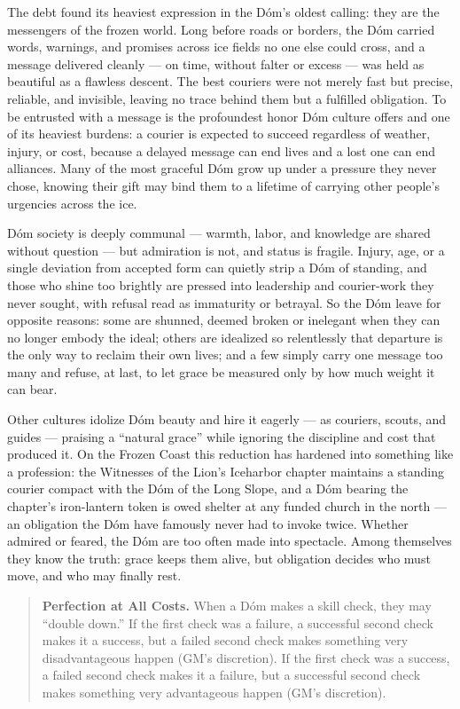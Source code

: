 The debt found its heaviest expression in the Dóm's oldest calling: they are the messengers of the frozen world. Long before roads or borders, the Dóm carried words, warnings, and promises across ice fields no one else could cross, and a message delivered cleanly --- on time, without falter or excess --- was held as beautiful as a flawless descent. The best couriers were not merely fast but precise, reliable, and invisible, leaving no trace behind them but a fulfilled obligation. To be entrusted with a message is the profoundest honor Dóm culture offers and one of its heaviest burdens: a courier is expected to succeed regardless of weather, injury, or cost, because a delayed message can end lives and a lost one can end alliances. Many of the most graceful Dóm grow up under a pressure they never chose, knowing their gift may bind them to a lifetime of carrying other people's urgencies across the ice.

Dóm society is deeply communal --- warmth, labor, and knowledge are shared without question --- but admiration is not, and status is fragile. Injury, age, or a single deviation from accepted form can quietly strip a Dóm of standing, and those who shine too brightly are pressed into leadership and courier-work they never sought, with refusal read as immaturity or betrayal. So the Dóm leave for opposite reasons: some are shunned, deemed broken or inelegant when they can no longer embody the ideal; others are idealized so relentlessly that departure is the only way to reclaim their own lives; and a few simply carry one message too many and refuse, at last, to let grace be measured only by how much weight it can bear.

Other cultures idolize Dóm beauty and hire it eagerly --- as couriers, scouts, and guides --- praising a ``natural grace'' while ignoring the discipline and cost that produced it. On the Frozen Coast this reduction has hardened into something like a profession: the Witnesses of the Lion's Iceharbor chapter maintains a standing courier compact with the Dóm of the Long Slope, and a Dóm bearing the chapter's iron-lantern token is owed shelter at any funded church in the north --- an obligation the Dóm have famously never had to invoke twice. Whether admired or feared, the Dóm are too often made into spectacle. Among themselves they know the truth: grace keeps them alive, but obligation decides who must move, and who may finally rest.

\begin{quote}
\textbf{Perfection at All Costs.} When a Dóm makes a skill check, they may ``double down.'' If the first check was a failure, a successful second check makes it a success, but a failed second check makes something very disadvantageous happen (GM's discretion). If the first check was a success, a failed second check makes it a failure, but a successful second check makes something very advantageous happen (GM's discretion).
\end{quote}

